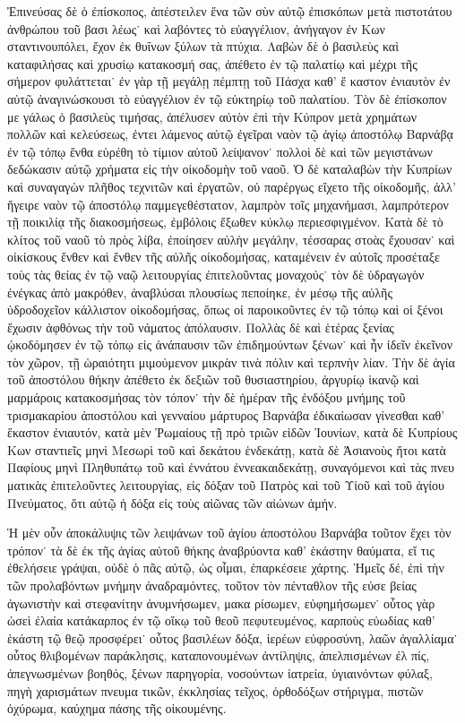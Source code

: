 Ἐπινεύσας δὲ ὁ ἐπίσκοπος, ἀπέστειλεν ἕνα τῶν σὺν
αὐτῷ ἐπισκόπων μετὰ πιστοτάτου ἀνθρώπου τοῦ βασι%
λέως˙ καὶ λαβόντες τὸ εὐαγγέλιον, ἀνήγαγον ἐν Κων%
σταντινουπόλει, ἔχον ἐκ θυΐνων ξύλων τὰ πτύχια. Λαβὼν
δὲ ὁ βασιλεὺς καὶ καταφιλήσας καὶ χρυσίῳ κατακοσμή%
σας, ἀπέθετο ἐν τῷ παλατίῳ καὶ μέχρι τῆς σήμερον
φυλάττεται˙ ἐν γὰρ τῇ μεγάλῃ πέμπτῃ τοῦ Πάσχα καθ’ ἕ%
καστον ἐνιαυτὸν ἐν αὐτῷ ἀναγινώσκουσι τὸ εὐαγγέλιον
ἐν τῷ εὐκτηρίῳ τοῦ παλατίου. Τὸν δὲ ἐπίσκοπον με%
γάλως ὁ βασιλεὺς τιμήσας, ἀπέλυσεν αὐτὸν ἐπὶ τὴν
Κύπρον μετὰ χρημάτων πολλῶν καὶ κελεύσεως, ἐντει%
λάμενος αὐτῷ ἐγεῖραι ναὸν τῷ ἁγίῳ ἀποστόλῳ Βαρνάβᾳ
ἐν τῷ τόπῳ ἔνθα εὑρέθη τὸ τίμιον αὐτοῦ λείψανον˙
πολλοὶ δὲ καὶ τῶν μεγιστάνων δεδώκασιν αὐτῷ χρήματα
εἰς τὴν οἰκοδομὴν τοῦ ναοῦ. Ὁ δὲ καταλαβὼν τὴν
Κυπρίων καὶ συναγαγὼν πλῆθος τεχνιτῶν καὶ ἐργατῶν,
οὐ παρέργως εἴχετο τῆς οἰκοδομῆς, ἀλλ’ ἤγειρε ναὸν
τῷ ἀποστόλῳ παμμεγεθέστατον, λαμπρὸν τοῖς μηχανήμασι,
λαμπρότερον τῇ ποικιλίᾳ τῆς διακοσμήσεως, ἐμβόλοις
ἔξωθεν κύκλῳ περιεσφιγμένον. Κατὰ δὲ τὸ κλίτος τοῦ
ναοῦ τὸ πρὸς λίβα, ἐποίησεν αὐλὴν μεγάλην, τέσσαρας
στοὰς ἔχουσαν˙ καὶ οἰκίσκους ἔνθεν καὶ ἔνθεν τῆς αὐλῆς
οἰκοδομήσας, καταμένειν ἐν αὐτοῖς προσέταξε τοὺς τὰς
θείας ἐν τῷ ναῷ λειτουργίας ἐπιτελοῦντας μοναχούς˙
τὸν δὲ ὑδραγωγὸν ἐνέγκας ἀπὸ μακρόθεν, ἀναβλύσαι
πλουσίως πεποίηκε, ἐν μέσῳ τῆς αὐλῆς ὑδροδοχεῖον
κάλλιστον οἰκοδομήσας, ὅπως οἱ παροικοῦντες ἐν τῷ
τόπῳ καὶ οἱ ξένοι ἔχωσιν ἀφθόνως τὴν τοῦ νάματος
ἀπόλαυσιν. Πολλὰς δὲ καὶ ἑτέρας ξενίας ᾠκοδόμησεν ἐν
τῷ τόπῳ εἰς ἀνάπαυσιν τῶν ἐπιδημούντων ξένων˙ καὶ
ἦν ἰδεῖν ἐκεῖνον τὸν χῶρον, τῇ ὡραιότητι μιμούμενον
μικρὰν τινὰ πόλιν καὶ τερπνὴν λίαν. Τὴν δὲ ἁγία τοῦ
ἀποστόλου θήκην ἀπέθετο ἐκ δεξιῶν τοῦ θυσιαστηρίου,
ἀργυρίῳ ἱκανῷ καὶ μαρμάροις κατακοσμήσας τὸν τόπον˙
τὴν δὲ ἡμέραν τῆς ἐνδόξου μνήμης τοῦ τρισμακαρίου
ἀποστόλου καὶ γενναίου μάρτυρος Βαρνάβα ἐδικαίωσαν
γίνεσθαι καθ’ ἕκαστον ἐνιαυτόν, κατὰ μὲν Ῥωμαίους τῇ
πρὸ τριῶν εἰδῶν Ἰουνίων, κατὰ δὲ Κυπρίους Κων%
σταντιεῖς μηνὶ Μεσωρὶ τοῦ καὶ δεκάτου ἑνδεκάτῃ, κατὰ
δὲ Ἀσιανοὺς ἤτοι κατὰ Παφίους μηνὶ Πληθυπάτῳ τοῦ
καὶ ἐννάτου ἐννεακαιδεκάτῃ, συναγόμενοι καὶ τὰς πνευ%
ματικὰς ἐπιτελοῦντες λειτουργίας, εἰς δόξαν τοῦ Πατρὸς
καὶ τοῦ Υἱοῦ καὶ τοῦ ἁγίου Πνεύματος, ὅτι αὐτῷ ἡ
δόξα εἰς τοὺς αἰῶνας τῶν αἰώνων ἀμήν.


\saut

Ἡ μὲν οὖν ἀποκάλυψις τῶν λειψάνων τοῦ ἁγίου
ἀποστόλου Βαρνάβα τοῦτον ἔχει τὸν τρόπον˙ τὰ δὲ ἐκ
τῆς ἁγίας αὐτοῦ θήκης ἀναβρύοντα καθ’ ἑκάστην θαύματα,
εἴ τις ἐθελήσειε γράψαι, οὐδὲ ὁ πᾶς αὐτῷ, ὡς οἶμαι,
ἐπαρκέσειε χάρτης. Ἡμεῖς δέ, ἐπὶ τὴν τῶν προλαβόντων
μνήμην ἀναδραμόντες, τοῦτον τὸν πένταθλον τῆς εὐσε%
βείας ἀγωνιστὴν καὶ στεφανίτην ἀνυμνήσωμεν, μακα%
ρίσωμεν, εὐφημήσωμεν˙ οὗτος γὰρ ὡσεὶ ἐλαία κατάκαρπος
ἐν τῷ οἴκῳ τοῦ θεοῦ πεφυτευμένος, καρποὺς εὐωδίας
καθ’ ἑκάστη τῷ θεῷ προσφέρει˙ οὗτος βασιλέων δόξα,
ἱερέων εὐφροσύνη, λαῶν ἀγαλλίαμα˙ οὗτος θλιβομένων
παράκλησις, καταπονουμένων ἀντίληψις, ἀπελπισμένων ἐλ%
πίς, ἀπεγνωσμένων βοηθός, ξένων παρηγορία, νοσούντων
ἰατρεία, ὑγιαινόντων φύλαξ, πηγὴ χαρισμάτων πνευμα%
τικῶν, ἐκκλησίας τεῖχος, ὀρθοδόξων στήριγμα, πιστῶν
ὀχύρωμα, καύχημα πάσης τῆς οἰκουμένης.

